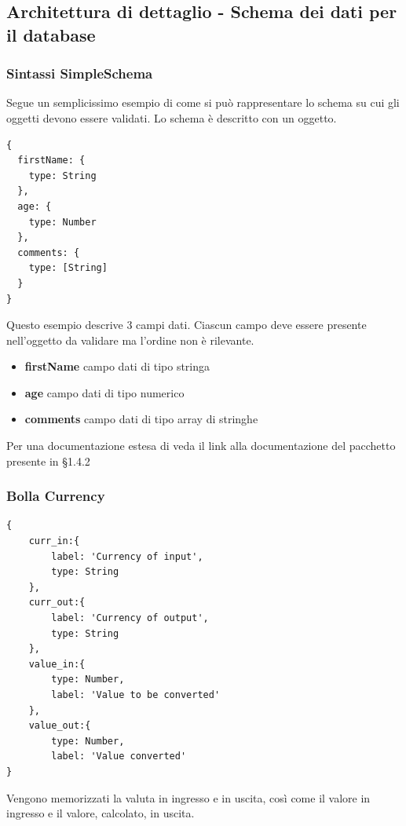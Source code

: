 




\subsection{Architettura di dettaglio - Schema dei dati per il
  database}
\subsubsection{Sintassi SimpleSchema}

Segue un semplicissimo esempio di come si può rappresentare lo schema
su cui gli oggetti devono essere validati. Lo schema è descritto con
un oggetto.

\begin{lstlisting}
{
  firstName: {
    type: String
  },
  age: {
    type: Number
  },
  comments: {
    type: [String]
  }
}
\end{lstlisting}

Questo esempio descrive 3 campi dati. Ciascun campo deve essere
presente nell'oggetto da validare ma l'ordine non è rilevante.
\begin{itemize}
\item \textbf{firstName} campo dati di tipo stringa
\item \textbf{age} campo dati di tipo numerico
\item \textbf{comments} campo dati di tipo array di stringhe
\end{itemize}
Per una documentazione estesa di veda il link alla documentazione del
pacchetto presente in \S 1.4.2

\subsubsection{Bolla Currency}
\begin{lstlisting}
{
	curr_in:{
		label: 'Currency of input',
		type: String
	},
	curr_out:{
		label: 'Currency of output',
		type: String
	},
	value_in:{
		type: Number,
		label: 'Value to be converted'
	},
	value_out:{
		type: Number,
		label: 'Value converted'
}
\end{lstlisting}
Vengono memorizzati la valuta in ingresso e in uscita, così come il
valore in ingresso e il valore, calcolato, in uscita.


